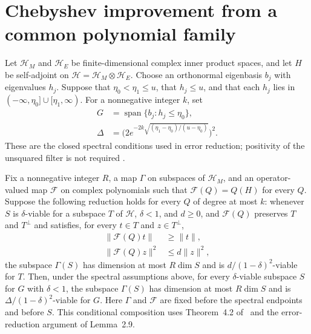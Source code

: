 \section{Chebyshev improvement from a common polynomial family}

Let $\mathcal H_M$ and $\mathcal H_E$ be finite-dimensional complex inner
product spaces, and let $H$ be self-adjoint on
$\mathcal H=\mathcal H_M\otimes\mathcal H_E$. Choose an orthonormal eigenbasis
$b_j$ with eigenvalues $h_j$. Suppose that $\eta_0<\eta_1\le u$, that
$h_j\le u$, and that each $h_j$ lies in $(-\infty,\eta_0]\cup[\eta_1,\infty)$.
For a nonnegative integer $k$, set
\begin{align}
    G      & =\operatorname{span}\{b_j:h_j\le\eta_0\},
    \label{eq:cheb_viable_low_space}                                   \\
    \Delta & =\bigl(2e^{-2k\sqrt{(\eta_1-\eta_0)/(u-\eta_0)}}\bigr)^2.
    \label{eq:cheb_viable_error}
\end{align}
These are the closed spectral conditions used in error reduction; positivity
of the unsquared filter is not required
\cite{gap:alvv16_spectral_projector_boundary,gap:alvv16_chebyshev_filter_positivity}.

\begin{theorem}
    \label{thm:chebyshev_viability_polynomial_reduction}
    \leanok
    Fix a nonnegative integer $R$, a map $\Gamma$ on subspaces of
    $\mathcal H_M$, and an operator-valued map $\mathcal F$ on complex
    polynomials such that $\mathcal F(Q)=Q(H)$ for every $Q$.
    Suppose the following reduction holds for every $Q$ of degree at most
    $k$: whenever $S$ is $\delta$-viable for a subspace $T$ of $\mathcal H$,
    $\delta<1$, and $d\ge0$, and $\mathcal F(Q)$ preserves $T$ and $T^\perp$
    and satisfies, for every $t\in T$ and $z\in T^\perp$,
    \begin{align}
        \|\mathcal F(Q)t\|   & \ge\|t\|,     \\
        \|\mathcal F(Q)z\|^2 & \le d\|z\|^2,
    \end{align}
    the subspace $\Gamma(S)$ has dimension at most $R\dim S$ and is
    $d/(1-\delta)^2$-viable for $T$.
    Then, under the spectral assumptions above, for every $\delta$-viable
    subspace $S$ for $G$ with $\delta<1$, the subspace $\Gamma(S)$
    has dimension at most $R\dim S$ and is
    $\Delta/(1-\delta)^2$-viable for $G$.
    Here $\Gamma$ and $\mathcal F$ are fixed before the spectral endpoints
    and before $S$. This conditional composition uses
    Theorem~4.2 of~\cite[lines 789--853]{Arad2016RigorousRG}
    and the error-reduction argument of Lemma~2.9.
\end{theorem}

